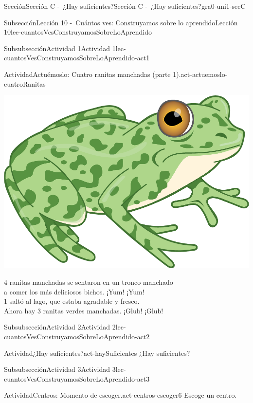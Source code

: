 \documentclass[twoside,10pt,]{article}
\begin{document}
\begin{sectionptx}{Sección}{Sección C -~¿Hay suficientes?}{}{Sección C -~¿Hay suficientes?}{}{}{gra0-uni1-secC}
\begin{subsectionptx}{Subsección}{Lección 10 -~Cuántos ves: Construyamos sobre lo aprendido}{}{Lección 10}{}{}{lec-cuantosVesConstruyamosSobreLoAprendido}
\begin{subsubsectionptx}{Subsubsección}{Actividad 1}{}{Actividad 1}{}{}{lec-cuantosVesConstruyamosSobreLoAprendido-act1}
\begin{activity}{Actividad}{Actuémoslo: Cuatro ranitas manchadas (parte 1).}{act-actuemoslo-cuatroRanitas}
\begin{image}{0.275}{0.45}{0.275}{}
\includegraphics[width=\linewidth]{external/png-source/RANA-VERDE.png}
\end{image}%
%
\par
4 ranitas manchadas se sentaron en un tronco manchado\\
 a comer los más deliciosos bichos. ¡Yum! ¡Yum!\\
 1 saltó al lago, que estaba agradable y fresco.\\
 Ahora hay 3 ranitas verdes manchadas. ¡Glub! ¡Glub!%
\end{activity}%
\end{subsubsectionptx}
%
%
\typeout{************************************************}
\typeout{************************************************}
%
\begin{subsubsectionptx}{Subsubsección}{Actividad 2}{}{Actividad 2}{}{}{lec-cuantosVesConstruyamosSobreLoAprendido-act2}
\begin{activity}{Actividad}{¿Hay suficientes?}{act-haySuficientes}%
¿Hay suficientes?%
\end{activity}%
\end{subsubsectionptx}
%
%
\typeout{************************************************}
\typeout{************************************************}
%
\begin{subsubsectionptx}{Subsubsección}{Actividad 3}{}{Actividad 3}{}{}{lec-cuantosVesConstruyamosSobreLoAprendido-act3}
\begin{activity}{Actividad}{Centros: Momento de escoger.}{act-centros-escoger6}%
Escoge un centro.%
\begin{sidebyside}{2}{0.025}{0.025}{0.05}%

\end{sidebyside}
\end{activity}
\end{subsubsectionptx}
\end{subsectionptx}
\end{sectionptx}
\end{document}
